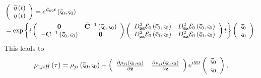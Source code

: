 \documentclass[aps,preprint]{revtex4}%
\begin{document}
\begin{align}
&  \left(
\begin{array}
[c]{c}%
\mathbf{\bar{\eta}}\left(  t\right) \\
\mathbf{\eta}\left(  t\right)
\end{array}
\right)  =e^{\mathcal{L}_{02}t}\left(  \mathbf{\bar{\varsigma}}_{0}%
,\mathbf{\varsigma}_{0}\right) \nonumber\\
&  =\exp\left\{  i\left(
\begin{array}
[c]{cc}%
\mathbf{0} & \mathbf{\bar{C}}^{-1}\left(  \mathbf{\bar{\varsigma}}%
_{0},\mathbf{\varsigma}_{0}\right) \\
-\mathbf{C}^{-1}\left(  \mathbf{\bar{\varsigma}}_{0},\mathbf{\varsigma}%
_{0}\right)  & \mathbf{0}%
\end{array}
\right)  \left(
\begin{array}
[c]{cc}%
D_{\mathbf{\bar{z}\bar{z}}}^{2}\mathcal{E}_{0}\left(  \mathbf{\bar{\varsigma}%
}_{0},\mathbf{\varsigma}_{0}\right)  & D_{\mathbf{\bar{z}z}}^{2}%
\mathcal{E}_{0}\left(  \mathbf{\bar{\varsigma}}_{0},\mathbf{\varsigma}%
_{0}\right) \\
D_{\mathbf{z\bar{z}}}^{2}\mathcal{E}_{0}\left(  \mathbf{\bar{\varsigma}}%
_{0},\mathbf{\varsigma}_{0}\right)  & D_{\mathbf{zz}}^{2}\mathcal{E}%
_{0}\left(  \mathbf{\bar{\varsigma}}_{0},\mathbf{\varsigma}_{0}\right)
\end{array}
\right)  t\right\}  \left(
\begin{array}
[c]{c}%
\mathbf{\bar{\varsigma}}_{0}\\
\mathbf{\varsigma}_{0}%
\end{array}
\right)  . \label{linevol}%
\end{align}
This leads to
\begin{equation}
\rho_{1jiH}\left(  \tau\right)  =\rho_{ji}\left(  \mathbf{\bar{\varsigma}}%
_{0},\mathbf{\varsigma}_{0}\right)  +\left(
\begin{array}
[c]{cc}%
\frac{\partial\rho_{ji}\left(  \mathbf{\bar{\varsigma}}_{0},\mathbf{\varsigma
}_{0}\right)  }{\partial\mathbf{\bar{z}}} & \frac{\partial\rho_{ji}\left(
\mathbf{\bar{\varsigma}}_{0},\mathbf{\varsigma}_{0}\right)  }{\partial
\mathbf{z}}%
\end{array}
\right)  e^{i\mathbb{M}t}\left(
\begin{array}
[c]{c}%
\mathbf{\bar{\varsigma}}_{0}\\
\mathbf{\varsigma}_{0}%
\end{array}
\right)  ,
\end{equation}
\end{document}
